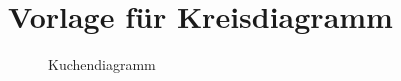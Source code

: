 \documentclass[ngerman,pdftex,12pt,a4paper]{scrreprt}
\begin{document}
\chapter{Vorlage für Kreisdiagramm}

\begin{figure}[h]
\centering
{}
\caption{Kuchendiagramm }
\label{fig:passingOwasp} 
\end{figure}
\end{document}
